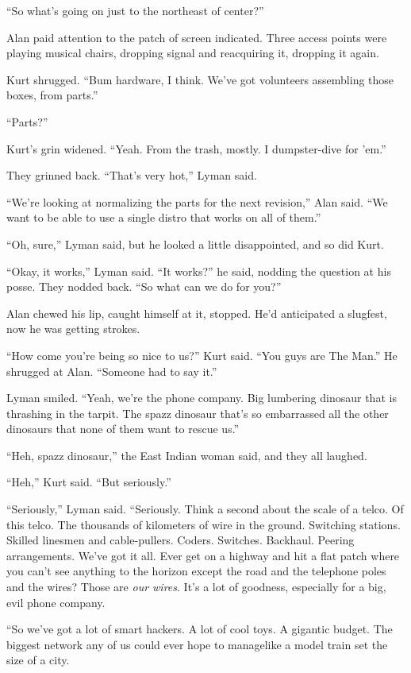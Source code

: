 ``So what's going on just to the northeast of center?''

Alan paid attention to the patch of screen indicated.  Three access
points were playing musical chairs, dropping signal and reacquiring
it, dropping it again.

Kurt shrugged.  ``Bum hardware, I think.  We've got volunteers
assembling those boxes, from parts.''

``Parts?''

Kurt's grin widened.  ``Yeah.  From the trash, mostly.  I
dumpster-dive for 'em.''

They grinned back.  ``That's very hot,'' Lyman said.

``We're looking at normalizing the parts for the next revision,'' Alan
said.  ``We want to be able to use a single distro that works on all
of them.''

``Oh, sure,'' Lyman said, but he looked a little disappointed, and so
did Kurt.

``Okay, it works,'' Lyman said.  ``It works?'' he said, nodding the
question at his posse.  They nodded back.  ``So what can we do for
you?''

Alan chewed his lip, caught himself at it, stopped.  He'd anticipated
a slugfest, now he was getting strokes.

``How come you're being so nice to us?'' Kurt said.  ``You guys are
The Man.'' He shrugged at Alan.  ``Someone had to say it.''

Lyman smiled.  ``Yeah, we're the phone company.  Big lumbering
dinosaur that is thrashing in the tarpit.  The spazz dinosaur that's
so embarrassed all the other dinosaurs that none of them want to
rescue us.''

``Heh, spazz dinosaur,'' the East Indian woman said, and they all
laughed.

``Heh,'' Kurt said.  ``But seriously.''

``Seriously,'' Lyman said.  ``Seriously.  Think a second about the
scale of a telco.  Of this telco.  The thousands of kilometers of wire
in the ground.  Switching stations.  Skilled linesmen and
cable-pullers.  Coders.  Switches.  Backhaul.  Peering arrangements. 
We've got it all.  Ever get on a highway and hit a flat patch where
you can't see anything to the horizon except the road and the
telephone poles and the wires?  Those are \textit{our wires}.  It's a
lot of goodness, especially for a big, evil phone company.

``So we've got a lot of smart hackers.  A lot of cool toys.  A
gigantic budget.  The biggest network any of us could ever hope to
manage\dash{}like a model train set the size of a city.

